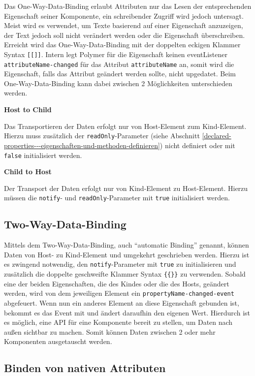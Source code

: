 Das One-Way-Data-Binding erlaubt Attributen nur das Lesen der entsprechenden Eigenschaft seiner Komponente, ein schreibender Zugriff wird jedoch untersagt. Meist wird es verwendet, um Texte basierend auf einer Eigenschaft anzuzeigen, der Text jedoch soll nicht verändert werden oder die Eigenschaft überschreiben. Erreicht wird das One-Way-Data-Binding mit der doppelten eckigen Klammer Syntax \texttt{{[}{[}{]}{]}}. Intern legt Polymer für die Eigenschaft keinen eventListener \texttt{attributeName-changed} für das Attribut \texttt{attributeName} an, somit wird die Eigenschaft, falls das Attribut geändert werden sollte, nicht upgedatet. Beim One-Way-Data-Binding kann dabei zwischen 2 Möglichkeiten unterschieden werden.


\textbf{Host to Child}

Das Transportieren der Daten erfolgt nur von Host-Element zum Kind-Element. Hierzu muss zusätzlich der \texttt{readOnly}-Parameter (siehe Abschnitt \ref{declared-properties---eigenschaften-und-methoden-definieren}) nicht definiert oder mit \texttt{false} initialisiert werden.

\textbf{Child to Host}

Der Transport der Daten erfolgt nur von Kind-Element zu Host-Element. Hierzu müssen die \texttt{notify}- und \texttt{readOnly}-Parameter mit \texttt{true} initialisiert werden.


\subsection{Two-Way-Data-Binding}\label{two-way-data-binding}

Mittels dem Two-Way-Data-Binding, auch ``automatic Binding'' genannt, können Daten von Host- zu Kind-Element und umgekehrt geschrieben werden. Hierzu ist es zwingend notwendig, den \texttt{notify}-Parameter mit \texttt{true} zu initialisieren und zusätzlich die doppelte geschweifte Klammer Syntax \texttt{\{\{\}\}} zu verwenden. Sobald eine der beiden Eigenschaften, die des Kindes oder die des Hosts, geändert werden, wird von dem jeweiligen Element ein \texttt{propertyName-changed-event} abgefeuert. Wenn nun ein anderes Element an diese Eigenschaft gebunden ist, bekommt es das Event mit und ändert daraufhin den eigenen Wert. Hierdurch ist es möglich, eine \ac{API} für eine Komponente bereit zu stellen, um Daten nach außen sichtbar zu machen. Somit können Daten zwischen 2 oder mehr Komponenten ausgetauscht werden.


\subsection{Binden von nativen Attributen}\label{binden-von-nativen-attributen}

